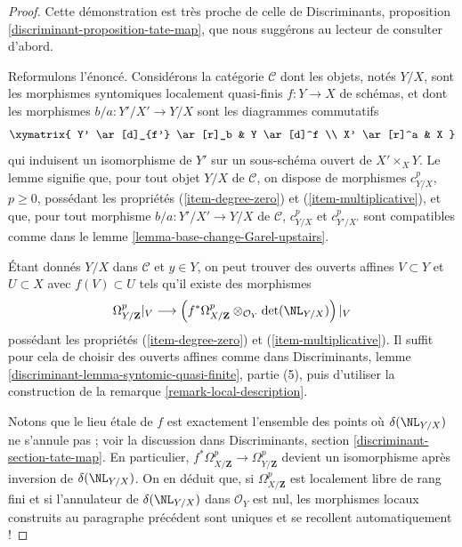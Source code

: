 \begin{proof}
Cette démonstration est très proche de celle de
Discriminants, proposition \ref{discriminant-proposition-tate-map},
que nous suggérons au lecteur de consulter d'abord.

\medskip\noindent
Reformulons l'énoncé. Considérons la catégorie
$\mathcal{C}$ dont les objets, notés $Y/X$, sont les morphismes syntomiques localement quasi-finis
$f : Y \to X$ de schémas, et dont les morphismes
$b/a : Y'/X' \to Y/X$ sont les diagrammes commutatifs
$$
\xymatrix{
Y' \ar[d]_{f'} \ar[r]_b & Y \ar[d]^f \\
X' \ar[r]^a & X
}
$$
qui induisent un isomorphisme de $Y'$ sur un sous-schéma ouvert de
$X' \times_X Y$. Le lemme signifie que, pour tout objet
$Y/X$ de $\mathcal{C}$, on dispose de morphismes $c^p_{Y/X}$, $p \geq 0$,
possédant les propriétés (\ref{item-degree-zero}) et (\ref{item-multiplicative}),
et que, pour tout morphisme $b/a : Y'/X' \to Y/X$ de $\mathcal{C}$,
$c^p_{Y/X}$ et $c^p_{Y'/X'}$ sont compatibles comme dans le
lemme \ref{lemma-base-change-Garel-upstairs}.

\medskip\noindent
Étant donnés $Y/X$ dans $\mathcal{C}$ et $y \in Y$, on peut trouver
des ouverts affines $V \subset Y$ et $U \subset X$ avec $f(V) \subset U$
tels qu'il existe des morphismes
$$
\Omega^p_{Y/\mathbf{Z}}|_V
\longrightarrow
\left(
f^*\Omega^p_{X/\mathbf{Z}} \otimes_{\mathcal{O}_Y} \det(\NL_{Y/X})
\right)|_V
$$
possédant les propriétés (\ref{item-degree-zero}) et (\ref{item-multiplicative}).
Il suffit pour cela de choisir des ouverts affines comme dans
Discriminants, lemme \ref{discriminant-lemma-syntomic-quasi-finite}, partie (5),
puis d'utiliser la construction de la remarque \ref{remark-local-description}.

\medskip\noindent
Notons que le lieu étale de $f$ est exactement l'ensemble des points où
$\delta(\NL_{Y/X})$ ne s'annule pas ; voir la discussion dans
Discriminants, section \ref{discriminant-section-tate-map}.
En particulier,
$f^*\Omega^p_{X/\mathbf{Z}} \to \Omega^p_{Y/\mathbf{Z}}$
devient un isomorphisme après inversion de $\delta(\NL_{Y/X})$.
On en déduit que, si $\Omega^p_{X/\mathbf{Z}}$ est localement libre de rang fini et si
l'annulateur de $\delta(\NL_{Y/X})$ dans $\mathcal{O}_Y$ est nul,
les morphismes locaux construits au paragraphe précédent
sont uniques et se recollent automatiquement !


\end{proof}
